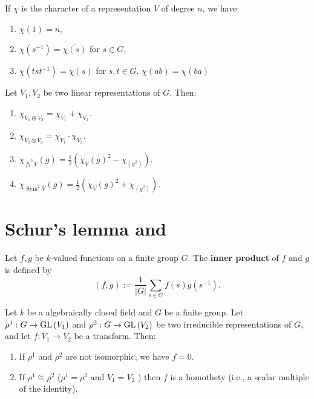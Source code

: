 \documentclass[12pt, oneside]{book}
\begin{document}
\begin{proposition}
    If $\chi$ is the character of a representation $V$ of degree $n$, we have:
    \begin{enumerate}
        \item
              $\chi(1)=n$,
        \item
              $\chi\left(s^{-1}\right)=\overline{\chi(s)}$ for $s \in G$,
        \item
              $\chi\left(t s t^{-1}\right)=\chi(s)$ for $s, t \in G$. $\chi(a b)=\chi(b a)$
    \end{enumerate}
\end{proposition}
\begin{proposition}
    Let $V_1,V_2$ be two linear representations of $G$.
    Then:
    \begin{enumerate}
        \item
              $\chi_{V_1 \oplus V_2} = \chi_{V_1} + \chi_{V_2}$.
        \item
              $\chi_{V_1\otimes V_2} = \chi_{V_1} \cdot \chi_{V_2}$.
        \item
              $\chi_{\bigwedge^2 V}\left(g\right) = \frac{1}{2}\left(\chi_V(g)^2 - \chi_(g^2)\right)$.
        \item
              $\chi_{\operatorname{Sym}^2 V}\left(g\right) = \frac{1}{2}\left(\chi_V(g)^2 + \chi_(g^2)\right)$.
    \end{enumerate}
\end{proposition}

\section{Schur's lemma and }%

\begin{definition}
    Let $f,g$ be $k$-valued functions on a finite group $G$.
    The \textbf{inner product} of $f$ and $g$ is defined
    by
    \begin{equation*}
        \left(f ,g \right)
        :=
        \frac{1}{\left|G\right|} \sum_{s \in G} f(s) g(s^{-1}).
    \end{equation*}
\end{definition}

\begin{proposition}
    Let $k$ be a algebraically closed field and $G$ be a finite group.
    Let $\rho^1: G \rightarrow \operatorname{\operatorname{GL}}\left(V_1\right)$ and $\rho^2: G \rightarrow \operatorname{\operatorname{GL}}\left(V_2\right)$ be two irreducible representations of $G$, and let $f:V_1 \rightarrow V_2$ be a transform.
    Then:
    \begin{enumerate}
        \item
              If $\rho^1$ and $\rho^2$ are not isomorphic, we have $f=0$.

        \item
              If $\rho^1 \cong \rho^2$ ($\rho^1= \rho^2$ and $V_1 =   V_2$ ) then
              $f$ is a homothety (i.e., a scalar multiple of the identity).
    \end{enumerate}
\end{proposition}
\end{document}
